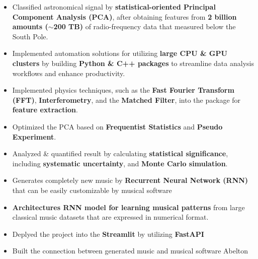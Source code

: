 \documentclass[10pt,a4paper,ragged2e,withhyper]{altacv}
\begin{document}
\begin{paracol}{2}

\begin{itemize}
\item Classified astronomical signal by {\bf statistical-oriented Principal Component Analysis (PCA)}, after obtaining features from {\bf 2 billion amounts (${\sim}$200 TB)} of radio-frequency data that measured below the South Pole.
\item Implemented automation solutions for utilizing {\bf large CPU \& GPU clusters} by building {\bf Python \& C++ packages} to streamline data analysis workflows and enhance productivity.
\item Implemented physics techniques, such as the {\bf Fast Fourier Transform (FFT)}, {\bf Interferometry}, and the {\bf Matched Filter}, into the package for {\bf feature extraction}.
\item Optimized the PCA based on {\bf Frequentist Statistics} and {\bf Pseudo Experiment}.
\item Analyzed \& quantified result by calculating {\bf statistical significance}, including {\bf systematic uncertainty}, and {\bf Monte Carlo simulation}.

\end{itemize}

\divider

\begin{itemize}
\item Generates completely new music by {\bf Recurrent Neural Network (RNN)} that can be easily customizable by musical software
\item {\bf Architectures RNN model for learning musical patterns} from large classical music datasets that are expressed in numerical format. 
\item Deplyed the project into the {\bf Streamlit} by utilizing {\bf FastAPI}
\item Built the connection between generated music and musical software Abelton
\end{itemize}


\end{paracol}
\end{document}
